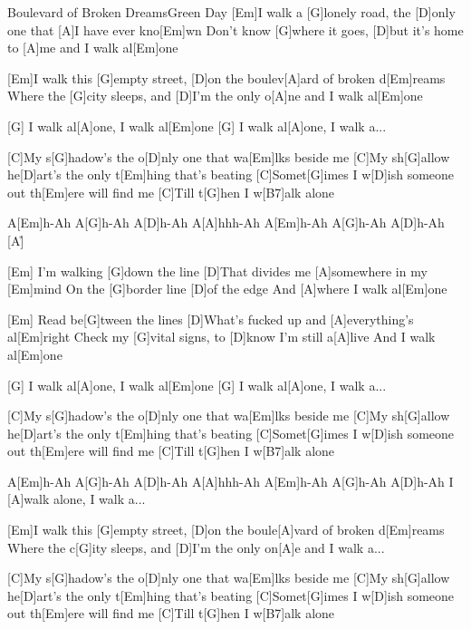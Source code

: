 \documentclass[../main.tex]{subfiles}
\begin{document}
\begin{song}{Boulevard of Broken Dreams}{Green Day}{}
[Em]I walk a [G]lonely road, the [D]only one that [A]I have ever kno[Em]wn
Don't know [G]where it goes, [D]but it's home to [A]me and I walk al[Em]one

[Em]I walk this [G]empty street, [D]on the boulev[A]ard of broken d[Em]reams
Where the [G]city sleeps, and [D]I'm the only o[A]ne and I walk al[Em]one

[G] \hh  [D] \hh I walk al[A]one, I walk al[Em]one
[G] \hh  [D] \hh I walk al[A]one, I walk a...

[C]My s[G]hadow's the o[D]nly one that wa[Em]lks beside me
[C]My sh[G]allow he[D]art's the only t[Em]hing that's beating
[C]Somet[G]imes I w[D]ish someone out th[Em]ere will find me
[C]Till t[G]hen I w[B7]alk alone

A[Em]h-Ah A[G]h-Ah A[D]h-Ah A[A]hhh-Ah
A[Em]h-Ah A[G]h-Ah A[D]h-Ah [A]{\h}

[Em] I'm walking [G]down the line
[D]That divides me [A]somewhere in my [Em]mind
On the [G]border line [D]of the edge
And [A]where I walk al[Em]one

[Em] Read be[G]tween the lines
[D]What's fucked up and [A]everything's al[Em]right
Check my [G]vital signs, to [D]know I'm still a[A]live
And I walk al[Em]one

[G] \hh  [D] \hh I walk al[A]one, I walk al[Em]one
[G] \hh  [D] \hh I walk al[A]one, I walk a...

[C]My s[G]hadow's the o[D]nly one that wa[Em]lks beside me
[C]My sh[G]allow he[D]art's the only t[Em]hing that's beating
[C]Somet[G]imes I w[D]ish someone out th[Em]ere will find me
[C]Till t[G]hen I w[B7]alk alone

A[Em]h-Ah A[G]h-Ah A[D]h-Ah A[A]hhh-Ah
A[Em]h-Ah A[G]h-Ah A[D]h-Ah I [A]walk alone, I walk a...

[Em]I walk this [G]empty street, [D]on the boule[A]vard of broken d[Em]reams
Where the c[G]ity sleeps, and [D]I'm the only on[A]e and I walk a...

[C]My s[G]hadow's the o[D]nly one that wa[Em]lks beside me
[C]My sh[G]allow he[D]art's the only t[Em]hing that's beating
[C]Somet[G]imes I w[D]ish someone out th[Em]ere will find me
[C]Till t[G]hen I w[B7]alk alone
\end{song}
\end{document}
